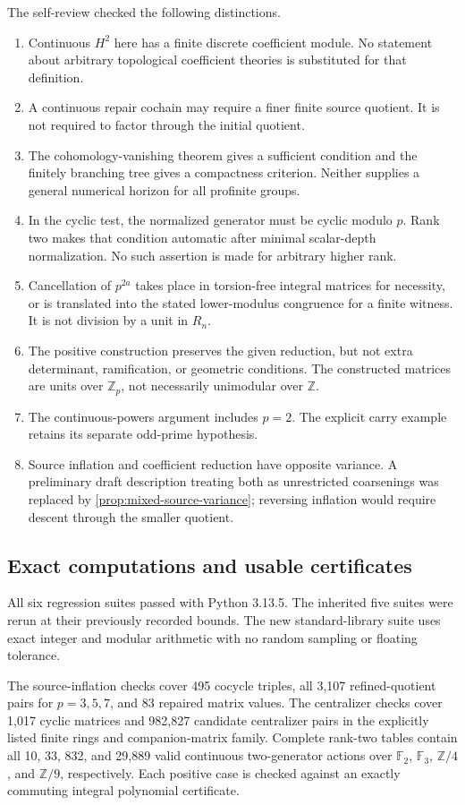 The self-review checked the following distinctions.
\begin{enumerate}
\item Continuous $H^2$ here has a finite discrete coefficient module. No statement about arbitrary topological coefficient theories is substituted for that definition.
\item A continuous repair cochain may require a finer finite source quotient. It is not required to factor through the initial quotient.
\item The cohomology-vanishing theorem gives a sufficient condition and the finitely branching tree gives a compactness criterion. Neither supplies a general numerical horizon for all profinite groups.
\item In the cyclic test, the normalized generator must be cyclic modulo $p$. Rank two makes that condition automatic after minimal scalar-depth normalization. No such assertion is made for arbitrary higher rank.
\item Cancellation of $p^{2a}$ takes place in torsion-free integral matrices for necessity, or is translated into the stated lower-modulus congruence for a finite witness. It is not division by a unit in $R_n$.
\item The positive construction preserves the given reduction, but not extra determinant, ramification, or geometric conditions. The constructed matrices are units over $\mathbb Z_p$, not necessarily unimodular over $\mathbb Z$.
\item The continuous-powers argument includes $p=2$. The explicit carry example retains its separate odd-prime hypothesis.
\item Source inflation and coefficient reduction have opposite variance. A preliminary draft description treating both as unrestricted coarsenings was replaced by \cref{prop:mixed-source-variance}; reversing inflation would require descent through the smaller quotient.
\end{enumerate}

\subsection{Exact computations and usable certificates}
All six regression suites passed with Python 3.13.5. The inherited five suites were rerun at their previously recorded bounds. The new standard-library suite uses exact integer and modular arithmetic with no random sampling or floating tolerance.

The source-inflation checks cover 495 cocycle triples, all 3,107 refined-quotient pairs for $p=3,5,7$, and 83 repaired matrix values. The centralizer checks cover 1,017 cyclic matrices and 982,827 candidate centralizer pairs in the explicitly listed finite rings and companion-matrix family. Complete rank-two tables contain all 10, 33, 832, and 29,889 valid continuous two-generator actions over $\mathbb F_2$, $\mathbb F_3$, $\mathbb Z/4$, and $\mathbb Z/9$, respectively. Each positive case is checked against an exactly commuting integral polynomial certificate.

